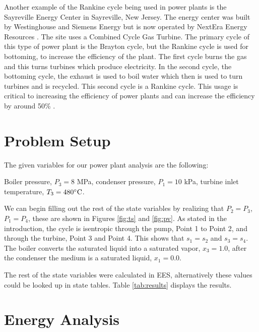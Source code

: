 \documentclass[12pt, letterpaper]{article}
\begin{document}
Another example of the Rankine cycle being used in power plants is the Sayreville Energy Center in Sayreville, New Jersey. The energy center was built by Westinghouse and Siemens Energy but is now operated by NextEra Energy Resources \cite{SA1}. The site uses a Combined Cycle Gas Turbine. The primary cycle of this type of power plant is the Brayton cycle, but the Rankine cycle is used for bottoming, to increase the efficiency of the plant. The first cycle burns the gas and this turns turbines which produce electricity. In the second cycle, the bottoming cycle, the exhaust is used to boil water which then is used to turn turbines and is recycled. This second cycle is a Rankine cycle. This usage is critical to increasing the efficiency of power plants and can increase the efficiency by around 50\% \cite{TVA}.


\section{Problem Setup}

The given variables for our power plant analysis are the following:

Boiler pressure, $P_3 = 8$ MPa, condenser pressure, $P_1 = 10$ kPa, turbine inlet temperature, $T_3 = 480^\circ\text{C}$.

We can begin filling out the rest of the state variables by realizing that $P_2 = P_3$, $P_1 = P_4$, these are shown in Figures \ref{fig:ts} and \ref{fig:pv}. As stated in the introduction, the cycle is isentropic through the pump, Point 1 to Point 2, and through the turbine, Point 3 and Point 4. This shows that $s_1 = s_2$ and $s_3=s_4$. The boiler converts the saturated liquid into a saturated vapor, $x_3 = 1.0$, after the condenser the medium is a saturated liquid, $x_1 = 0.0$.

The rest of the state variables were calculated in EES, alternatively these values could be looked up in state tables. Table \ref{tab:results} displays the results.

\begin{table}[H]
\centering
\stateTable
\caption{Summary of state variables.}
\label{tab:states}
\end{table}

\section{Energy Analysis}

\begin{table}[H]
\centering
\anaTable
\caption{Summary of energy analysis.}
\label{tab:results}
\end{table}
\end{document}
